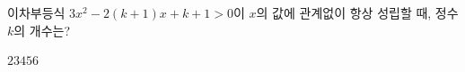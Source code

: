 이차부등식 $3x^2-2(k+1)x+k+1>0$이 $x$의 값에 관계없이 항상 성립할 때, 정수 $k$의 개수는?
\begin{choices32}{$2$}{$3$}{$4$}{$5$}{$6$}\end{choices32}
